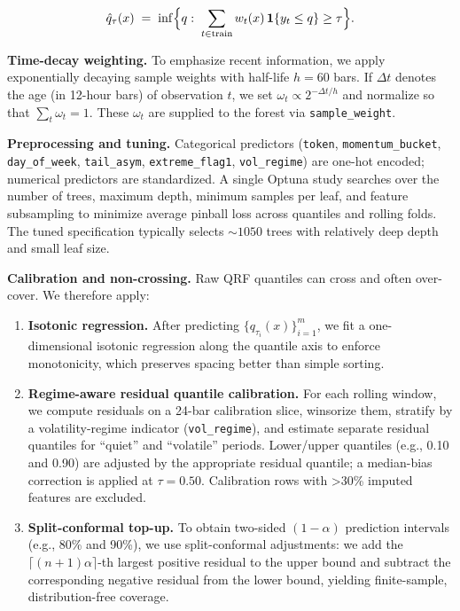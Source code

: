 \documentclass[
  a4paper,
  DIV=11,
  numbers=noendperiod]{scrreprt}
\providecommand{\tightlist}{%
  \setlength{\itemsep}{0pt}\setlength{\parskip}{0pt}}
\begin{document}
\[
\hat q_\tau(x)\;=\;\inf\Bigl\{q:\;\sum_{t\in\text{train}} w_t(x)\,\mathbf{1}\{y_t\le q\}\ge \tau\Bigr\}.
\]

\textbf{Time-decay weighting.} To emphasize recent information, we apply
exponentially decaying sample weights with half-life \(h=60\) bars. If
\(\Delta t\) denotes the age (in 12-hour bars) of observation \(t\), we
set \(\omega_t \propto 2^{-\Delta t/h}\) and normalize so that
\(\sum_t \omega_t=1\). These \(\omega_t\) are supplied to the forest via
\texttt{sample\_weight}.

\textbf{Preprocessing and tuning.} Categorical predictors
(\texttt{token}, \texttt{momentum\_bucket}, \texttt{day\_of\_week},
\texttt{tail\_asym}, \texttt{extreme\_flag1}, \texttt{vol\_regime}) are
one-hot encoded; numerical predictors are standardized. A single Optuna
study searches over the number of trees, maximum depth, minimum samples
per leaf, and feature subsampling to minimize average pinball loss
across quantiles and rolling folds. The tuned specification typically
selects \(\sim\!1050\) trees with relatively deep depth and small leaf
size.

\textbf{Calibration and non-crossing.} Raw QRF quantiles can cross and
often over-cover. We therefore apply:

\begin{enumerate}
\def\labelenumi{\arabic{enumi}.}
\tightlist
\item
  \textbf{Isotonic regression.} After predicting
  \(\{q_{\tau_i}(x)\}_{i=1}^m\), we fit a one-dimensional isotonic
  regression along the quantile axis to enforce monotonicity, which
  preserves spacing better than simple sorting.
\item
  \textbf{Regime-aware residual quantile calibration.} For each rolling
  window, we compute residuals on a 24-bar calibration slice, winsorize
  them, stratify by a volatility-regime indicator
  (\texttt{vol\_regime}), and estimate separate residual quantiles for
  ``quiet'' and ``volatile'' periods. Lower/upper quantiles (e.g., 0.10
  and 0.90) are adjusted by the appropriate residual quantile; a
  median-bias correction is applied at \(\tau=0.50\). Calibration rows
  with \textgreater30\% imputed features are excluded.
\item
  \textbf{Split-conformal top-up.} To obtain two-sided \((1-\alpha)\)
  prediction intervals (e.g., 80\% and 90\%), we use split-conformal
  adjustments: we add the \(\lceil (n+1)\alpha\rceil\)-th largest
  positive residual to the upper bound and subtract the corresponding
  negative residual from the lower bound, yielding finite-sample,
  distribution-free coverage.
\end{enumerate}
\end{document}
